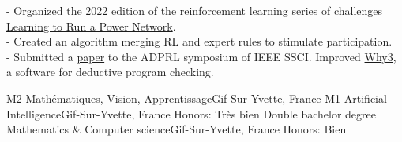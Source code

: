 \documentclass[
    10pt,
    A4,
    english,
    draft = false,
    twoside = false,
]{article}
\begin{document}
	
	
	{
	  - Organized the 2022 edition of the reinforcement learning              series of challenges
	   \href{https://l2rpn.chalearn.org/}{Learning to Run a Power Network}.\\
	  - Created an algorithm merging RL and expert rules to stimulate
        participation.\\
      - Submitted a
	    \href{https://hal.inria.fr/hal-03726294v2}{paper} to the ADPRL symposium of IEEE SSCI.
	    \vspace*{0.2cm}
	}
	{Improved \href{https://why3.lri.fr/}{Why3}, a software for
	deductive program checking.}
	
	{M2 Mathématiques, Vision, Apprentissage}{Gif-Sur-Yvette, France}
	{}
	{M1 Artificial Intelligence}{Gif-Sur-Yvette, France}
	{Honors: Très bien}
	{Double bachelor degree Mathematics \& Computer science}{Gif-Sur-Yvette,
	France}
	{Honors: Bien}
	
\end{document}
